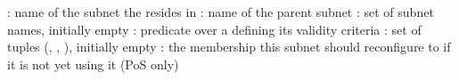 \begin{algorithm}[ht]
\footnotesize
\caption{\gwFull (\gw)}\label{alg:gw}
  \DontPrintSemicolon
    : name of the subnet the \gw resides in\;
    : name of the parent subnet\;
    : set of subnet names, initially empty\;
    : predicate over a \pof defining its validity criteria\;
    \var{\postoffice}: set of tuples (, , ), initially empty\;
    : the membership this subnet should reconfigure to if it is not yet using it (PoS only)\;
    \;
  
\end{algorithm}
